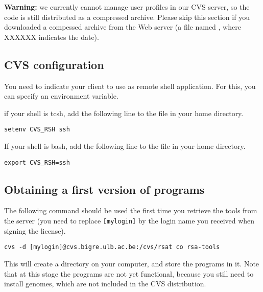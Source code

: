 \documentclass{book}
\begin{document}
\textbf{Warning:} we currently cannot manage user profiles in our CVS
server, so the \RSAT code is still distributed as a compressed
archive. Please skip this section if you downloaded a compessed
archive from the Web server (a file named
, where XXXXXX indicates the date).

\subsection{CVS configuration}

You need to indicate your  client to use 
as remote shell application. For this, you can specify an environment
variable.

if your shell is tcsh, add the following line to the 
file in your home directory.

\begin{footnotesize}
\begin{verbatim}
setenv CVS_RSH ssh
\end{verbatim}
\end{footnotesize}


If your shell is bash, add the following line to the 
file in your home directory.

\begin{footnotesize}
\begin{verbatim}
export CVS_RSH=ssh
\end{verbatim}
\end{footnotesize}



\subsection{Obtaining a first version of \RSAT programs}

The following command should be used the first time you retrieve the
tools from the server (you need to replace \texttt{[mylogin]} by the
login name you received when signing the \RSAT license).

\begin{footnotesize}
\begin{verbatim}
cvs -d [mylogin]@cvs.bigre.ulb.ac.be:/cvs/rsat co rsa-tools
\end{verbatim}
\end{footnotesize}


This will create a directory  on your computer, and
store the programs in it. Note that at this stage the programs are not
yet functional, because you still need to install genomes, which are
not included in the CVS distribution.
\end{document}
